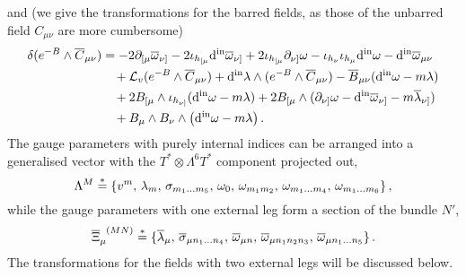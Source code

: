 \documentclass[debug]{phd}
\begin{document}
					and (we give the transformations for the barred fields, as those of the unbarred field $C_{\mu\nu}$ are more cumbersome)
							\begin{equation}\label{Cbar_transf}
								\begin{split}
									\delta (e^{-B} \wedge \overline{C}_{\mu\nu}) &= - 2\partial_{[\mu} \overline{\omega}_{\nu]} - 2\iota_{h_{[\mu}}\din \overline{\omega}_{\nu]} +2\iota_{h_{[\mu}}\partial_{\nu]}\omega -\iota_{h_{\nu}} \iota_{h_\mu} \din \omega - \din \overline{\omega}_{\mu\nu} \\
																		&\phantom{= \,} + \mathcal{L}_v (e^{-B}\wedge\overline{C}_{\mu\nu}) +\din\lambda \wedge (e^{-B}\wedge\overline{C}_{\mu\nu}) - \overline{B}_{\mu\nu} (\din \omega -m\lambda) \\
																		&\phantom{= \, } + 2 B_{[\mu} \wedge \iota_{h_{\nu]}}(\din \omega -m\lambda) + 2 B_{[\mu}\wedge ( \partial_{\nu]} \omega - \din\overline{\omega}_{\nu]} -m\overline{\lambda}_{\nu]}) \\
																		&\phantom{= \, } + B_{\mu} \wedge B_\nu \wedge \left(\din\omega - m \lambda\right) \,.
								\end{split}
							\end{equation}
					The gauge parameters with purely internal indices can be arranged into a generalised vector with the $T^*\otimes \Lambda^6T^*$ component projected out,
							\begin{equation}
								\Lambda^M \stackrel{*}{=} \{ v^m,\, \lambda_m,\, \sigma_{m_1\ldots m_5},\, \omega_0,\, \omega_{m_1m_2} ,\,\omega_{m_1\ldots m_4},\,\omega_{m_1\ldots m_6} \} \, ,
							\end{equation}
					while the gauge parameters with one external leg form a section of the bundle $N'$,
							\begin{equation}
								\overline{\Xi}_\mu^{\phantom{\mu}(MN)} \stackrel{*}{=} \{ \overline{\lambda}_\mu ,\, \overline{\sigma}_{\mu n_1\ldots n_4} ,\, \overline{\omega}_{\mu n},\, \overline{\omega}_{\mu n_1n_2n_3} ,\, \overline{\omega}_{\mu n_1\ldots n_5} \} \, .
							\end{equation}
					The transformations for the fields with two external legs will be discussed below.
 
\end{document}
